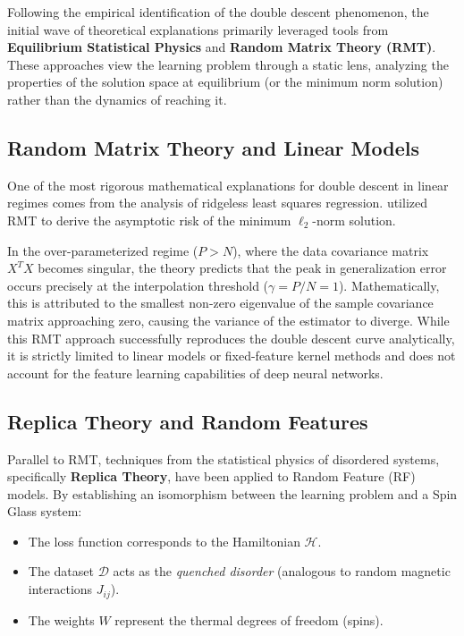 \documentclass[
  journal=largetwo,
  simfonts=false,
  year=2025,
  volume=37,
]{cup-journal}
\begin{document}
Following the empirical identification of the double descent phenomenon, the initial wave of theoretical explanations primarily leveraged tools from \textbf{Equilibrium Statistical Physics} and \textbf{Random Matrix Theory (RMT)}. These approaches view the learning problem through a static lens, analyzing the properties of the solution space at equilibrium (or the minimum norm solution) rather than the dynamics of reaching it.

\subsection{Random Matrix Theory and Linear Models}
One of the most rigorous mathematical explanations for double descent in linear regimes comes from the analysis of ridgeless least squares regression. \cite{hastie2019surprises} utilized RMT to derive the asymptotic risk of the minimum $\ell_2$-norm solution. 

In the over-parameterized regime ($P > N$), where the data covariance matrix $X^TX$ becomes singular, the theory predicts that the peak in generalization error occurs precisely at the interpolation threshold ($\gamma = P/N = 1$). Mathematically, this is attributed to the smallest non-zero eigenvalue of the sample covariance matrix approaching zero, causing the variance of the estimator to diverge. While this RMT approach successfully reproduces the double descent curve analytically, it is strictly limited to linear models or fixed-feature kernel methods and does not account for the feature learning capabilities of deep neural networks.

\subsection{Replica Theory and Random Features}
Parallel to RMT, techniques from the statistical physics of disordered systems, specifically \textbf{Replica Theory}, have been applied to Random Feature (RF) models. By establishing an isomorphism between the learning problem and a Spin Glass system:
\begin{itemize}
    \item The loss function corresponds to the Hamiltonian $\mathcal{H}$.
    \item The dataset $\mathcal{D}$ acts as the \textit{quenched disorder} (analogous to random magnetic interactions $J_{ij}$).
    \item The weights $W$ represent the thermal degrees of freedom (spins).
\end{itemize}
\end{document}
